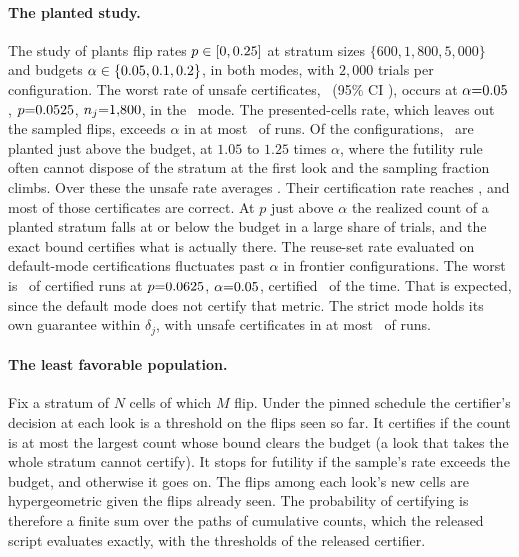 \paragraph{The planted study.} The study of 
plants flip rates $p \in [0, 0.25]$ at stratum sizes
$\{600, 1{,}800, 5{,}000\}$ and budgets $\alpha \in \{0.05, 0.1, 0.2\}$,
in both modes, with $2{,}000$ trials per configuration. The worst rate
of unsafe certificates, \calUnsafeWorst\ (95\% CI \calUnsafeWorstCi),
occurs at $\alpha{=}0.05$, $p{=}0.0525$,
$n_j{=}1{,}800$, in the \calUnsafeWorstEstimand\ mode. The
presented-cells rate, which leaves out the sampled flips, exceeds
$\alpha$ in at most \calUnsafePresentedWorst\ of runs. Of the
configurations, \calTightNulls\ are planted just above the budget, at
$1.05$ to $1.25$ times $\alpha$, where the futility rule often cannot
dispose of the stratum at the first look and the sampling fraction
climbs. Over these the unsafe rate averages \calUnsafeTightMean. Their
certification rate reaches \calTightCertWorst, and most of those
certificates are correct. At $p$ just above $\alpha$ the realized count
of a planted stratum falls at or below the budget in a large share of
trials, and the exact bound certifies what is actually there. The
reuse-set rate evaluated on default-mode certifications fluctuates past
$\alpha$ in frontier configurations. The worst is \calWorstReuseMetric\
of certified runs at $p{=}0.0625$, $\alpha{=}0.05$,
certified \calWorstCertRate\ of the time. That is expected, since the
default mode does not certify that metric. The strict mode holds its own
guarantee within $\delta_j$, with unsafe certificates in at most
\calUnsafeStrictWorst\ of runs.

\keeprunin
\paragraph{The least favorable population.} Fix a stratum of $N$ cells
of which $M$ flip. Under the pinned schedule the certifier's decision at
each look is a threshold on the flips seen so far. It certifies if the
count is at most the largest count whose bound clears the budget (a look
that takes the whole stratum cannot certify). It stops for futility if
the sample's rate exceeds the budget, and otherwise it goes on. The
flips among each look's new cells are hypergeometric given the flips
already seen. The probability of certifying is therefore a finite sum
over the paths of cumulative counts, which the released script
evaluates exactly, with the thresholds of the released certifier.

